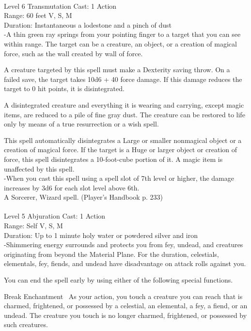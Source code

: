 \documentclass[10pt,twocolumn]{report}
\begin{document}
 \\
Level 6 \quad Transmutation \quad Cast: 1 Action\\
Range: 60 feet \quad V, S, M \\
Duration: Instantaneous \quad a lodestone and a pinch of dust\\
-A thin green ray springs from your pointing finger to a target that you can see within range. 
The target can be a creature, an object, or a creation of magical force, such as the wall created by wall of force. 

A creature targeted by this spell must make a Dexterity saving throw. On a failed save, the target takes 10d6 + 40 force damage. If this damage reduces the target to 0 hit points, it is disintegrated. 

A disintegrated creature and everything it is wearing and carrying, except magic items, are reduced to a pile of fine gray dust. The creature can be restored to life only by means of a true resurrection or a wish spell. 

This spell automatically disintegrates a Large or smaller nonmagical object or a creation of magical force. If the target is a Huge or larger object or creation of force, this spell disintegrates a 10-foot-cube portion of it. A magic item is unaffected by this spell.\\
-When you cast this spell using a spell slot of 7th level or higher, the damage increases by 3d6 for each slot level above 6th.\\
A Sorcerer, Wizard spell. (Player's Handbook p. 233) \\


 \\
Level 5 \quad Abjuration \quad Cast: 1 Action\\
Range: Self \quad V, S, M\\
Duration: Up to 1 minute \quad holy water or powdered silver and iron\\
-Shimmering energy surrounds and protects you from fey, undead, and creatures originating from beyond the Material Plane. For the duration, celestials, elementals, fey, fiends, and undead have disadvantage on attack rolls against you. 

You can end the spell early by using either of the following special functions. 

Break  Enchantment 
As your action, you touch a creature you can reach that is charmed, frightened, or possessed by a celestial, an elemental, a fey, a fiend, or an undead. The creature you touch is no longer charmed, frightened, or possessed by such creatures. 
\end{document}
